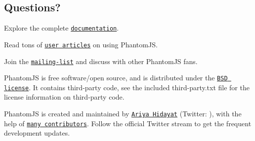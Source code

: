 \subsection*{Questions?}


\begin{DoxyItemize}
\item Explore the complete \href{http://phantomjs.org/documentation/}{\tt documentation}.
\item Read tons of \href{http://phantomjs.org/buzz.html}{\tt user articles} on using Phantom\+JS.
\item Join the \href{http://groups.google.com/group/phantomjs}{\tt mailing-\/list} and discuss with other Phantom\+JS fans.
\end{DoxyItemize}

Phantom\+JS is free software/open source, and is distributed under the \href{http://opensource.org/licenses/BSD-3-Clause}{\tt B\+SD license}. It contains third-\/party code, see the included {\ttfamily third-\/party.\+txt} file for the license information on third-\/party code.

Phantom\+JS is created and maintained by \href{http://ariya.ofilabs.com/about}{\tt Ariya Hidayat} (Twitter\+: \href{http://twitter.com/ariyahidayat}{\tt }), with the help of \href{https://github.com/ariya/phantomjs/contributors}{\tt many contributors}. Follow the official Twitter stream \href{http://twitter.com/PhantomJS}{\tt } to get the frequent development updates. 